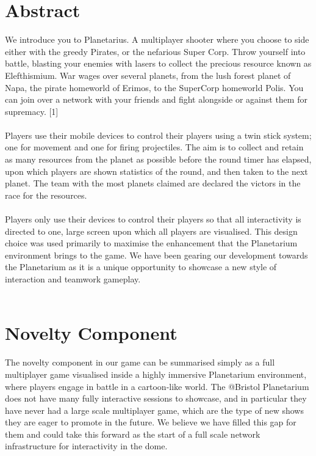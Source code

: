 \documentclass[11pt,a4paper]{article}
\begin{document}
\pagebreak
\tableofcontents

\pagebreak

\section{Abstract}

We introduce you to Planetarius. A multiplayer shooter where you choose to side either with the greedy Pirates, or the nefarious Super Corp. Throw yourself into battle, blasting your enemies with lasers to collect the precious resource known as Elefthismium. War wages over several planets, from the lush forest planet of Napa, the pirate homeworld of Erimos, to the SuperCorp homeworld Polis. You can join over a network with your friends and fight alongside or against them for supremacy. [1] \\ \\
Players use their mobile devices to control their players using a twin stick system; one for movement and one for firing projectiles. The aim is to collect and retain as many resources from the planet as possible before the round timer has elapsed, upon which players are shown statistics of the round, and then taken to the next planet. The team with the most planets claimed are declared the victors in the race for the resources. \\ \\
Players only use their devices to control their players so that all interactivity is directed to one, large screen upon which all players are visualised. This design choice was used primarily to maximise the enhancement that the Planetarium environment brings to the game. We have been gearing our development towards the Planetarium as it is a unique opportunity to showcase a new style of interaction and teamwork gameplay. \\ \\


\section{Novelty Component}

\noindent
 The novelty component in our game can be summarised simply as a full multiplayer game visualised inside a highly immersive Planetarium environment, where players engage in battle in a cartoon-like world. The @Bristol Planetarium does not have many fully interactive sessions to showcase, and in particular they have never had a large scale multiplayer game, which are the type of new shows they are eager to promote in the future. We believe we have filled this gap for them and could take this forward as the start of a full scale network infrastructure for interactivity in the dome. \\ \\
\end{document}
